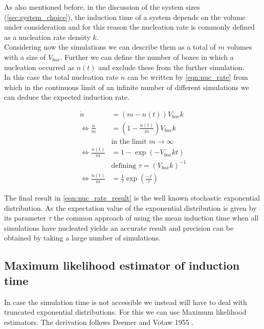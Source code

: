 As also mentioned before, in the discussion of the system sizes (\autoref{sec:system_choice}), the induction time of a system depends on the volume under consideration and for this reason the nucleation rate is commonly defined as a nucleation rate density $k$.\\ 
Considering now the simulations we can describe them as a total of $m$ volumes with a size of $V_{box}$.  Further we can define the number of boxes in which a nucleation occurred as $n(t)$ and exclude these from the further simulation.\\

In this case the total nucleation rate $ \dot{n} $ can be written by \autoref{eqn:nuc_rate} from which in the continuous limit of an infinite number of different simulations we can deduce the expected induction rate.

\begin{align}
\label{eqn:nuc_rate}
\dot{n} &= (m - n(t))V_{box}k\\
\Leftrightarrow \frac{\dot{n}}{m} &= (1 - \frac{n(t)}{m})V_{box}k\\
 &  \text{in the limit } m \rightarrow \infty \nonumber\\
\Leftrightarrow \frac{n(t)}{m} &= 1 - \exp\left( -V_{box} k t \right)\\
 &  \text{defining } \tau = (V_{box} k)^{-1} \nonumber\\
\label{eqn:nuc_rate_result}
\Leftrightarrow \frac{\dot{n}(t)}{m} &= \frac{1}{\tau} \exp\left( \frac{-t}{\tau} \right) 
\end{align}

The final result in \autoref{eqn:nuc_rate_result} is the well known stochastic exponential distribution. As the expectation value of the exponential distribution is given by its parameter $\tau$ the common approach of using the mean induction time when all simulations have nucleated yields an accurate result and precision can be obtained by taking a large number of simulations.\\


\subsection{Maximum likelihood estimator of induction time}
\label{sec:ml_estimator}
In case the simulation time is not accessible we instead will have to deal with truncated exponential distributions. For this we can use Maximum likelihood estimators. The derivation follows Deemer and Votaw 1955 \cite{Deemer1955}.\\

